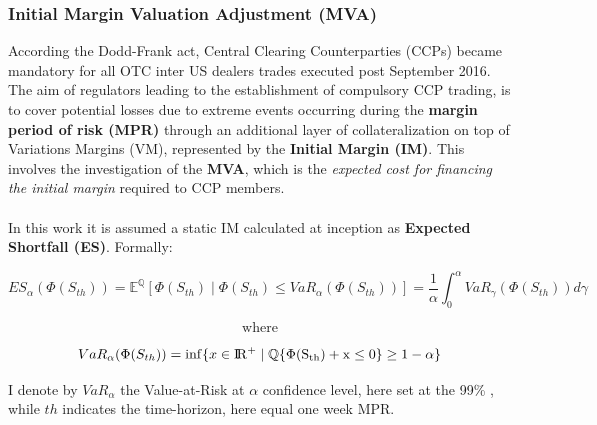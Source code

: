 \documentclass{beamer}
\begin{document}
\begin{frame}
\frametitle{Initial Margin Valuation Adjustment (MVA)}
	\footnotesize {According the Dodd-Frank act, Central Clearing Counterparties (CCPs) became mandatory for all OTC inter US dealers trades executed post September 2016. 
	 The aim of regulators leading to the establishment of compulsory CCP trading, is to  cover potential losses due to extreme events occurring during the \textbf{margin period of risk (MPR)} through an additional
	layer of collateralization on top of Variations Margins (VM), represented by the
	\textbf{Initial Margin (IM)}. 
	This involves the investigation of the \textbf{MVA}, which is the \textit{expected cost for financing the initial margin} required to CCP members.
	\\~\\
	In this work it is assumed a static IM calculated at inception as \textbf{Expected Shortfall (ES)}. Formally:
	
	\begin{equation}
	ES_{\alpha} (\Phi(S_{th})) = \mathbb{E}^{ \mathbb{Q} } \left[\Phi(S_{th}) \mid \Phi(S_{th}) \leq VaR_{\alpha}(\Phi(S_{th})) \right]= \frac{1}{\alpha} \int_{0}^{\alpha} VaR_{\gamma}(\Phi(S_{th}))d\gamma
	\end{equation}
	
	$$\text{where}$$
	
	\begin{equation}
	VaR_{\alpha}(\Phi(S_{th})) = \inf \lbrace x \in  {\rm I\!R^+ \mid \mathbb{Q} \lbrace \Phi(S_{th})+ x \leq 0 \rbrace \geq 1- \alpha }\rbrace
	\end{equation}
	
	
	I denote by $VaR_{\alpha}$ the Value-at-Risk at $\alpha$ confidence level, here set at the 99\% , while $th$ indicates the time-horizon, here equal one week MPR. 
}

\end{frame}
\end{document}
